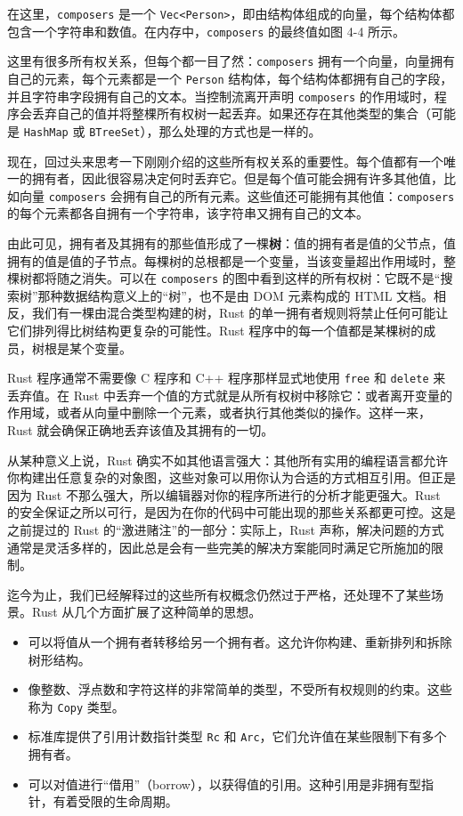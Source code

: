 在这里，\texttt{composers} 是一个 \texttt{Vec<Person>}，即由结构体组成的向量，每个结构体都包含一个字符串和数值。在内存中，\texttt{composers} 的最终值如图 4-4 所示。


这里有很多所有权关系，但每个都一目了然：\texttt{composers} 拥有一个向量，向量拥有自己的元素，每个元素都是一个 \texttt{Person} 结构体，每个结构体都拥有自己的字段，并且字符串字段拥有自己的文本。当控制流离开声明 \texttt{composers} 的作用域时，程序会丢弃自己的值并将整棵所有权树一起丢弃。如果还存在其他类型的集合（可能是 \texttt{HashMap} 或 \texttt{BTreeSet}），那么处理的方式也是一样的。

现在，回过头来思考一下刚刚介绍的这些所有权关系的重要性。每个值都有一个唯一的拥有者，因此很容易决定何时丢弃它。但是每个值可能会拥有许多其他值，比如向量 \texttt{composers} 会拥有自己的所有元素。这些值还可能拥有其他值：\texttt{composers} 的每个元素都各自拥有一个字符串，该字符串又拥有自己的文本。

由此可见，拥有者及其拥有的那些值形成了一棵\textbf{树}：值的拥有者是值的父节点，值拥有的值是值的子节点。每棵树的总根都是一个变量，当该变量超出作用域时，整棵树都将随之消失。可以在 \texttt{composers} 的图中看到这样的所有权树：它既不是“搜索树”那种数据结构意义上的“树”，也不是由 DOM 元素构成的 HTML 文档。相反，我们有一棵由混合类型构建的树，Rust 的单一拥有者规则将禁止任何可能让它们排列得比树结构更复杂的可能性。Rust 程序中的每一个值都是某棵树的成员，树根是某个变量。

Rust 程序通常不需要像 C 程序和 C++ 程序那样显式地使用 \texttt{free} 和 \texttt{delete} 来丢弃值。在 Rust 中丢弃一个值的方式就是从所有权树中移除它：或者离开变量的作用域，或者从向量中删除一个元素，或者执行其他类似的操作。这样一来，Rust 就会确保正确地丢弃该值及其拥有的一切。

从某种意义上说，Rust 确实不如其他语言强大：其他所有实用的编程语言都允许你构建出任意复杂的对象图，这些对象可以用你认为合适的方式相互引用。但正是因为 Rust 不那么强大，所以编辑器对你的程序所进行的分析才能更强大。Rust 的安全保证之所以可行，是因为在你的代码中可能出现的那些关系都更可控。这是之前提过的 Rust 的“激进赌注”的一部分：实际上，Rust 声称，解决问题的方式通常是灵活多样的，因此总是会有一些完美的解决方案能同时满足它所施加的限制。

迄今为止，我们已经解释过的这些所有权概念仍然过于严格，还处理不了某些场景。Rust 从几个方面扩展了这种简单的思想。

\begin{itemize}
\item 可以将值从一个拥有者转移给另一个拥有者。这允许你构建、重新排列和拆除树形结构。
\item 像整数、浮点数和字符这样的非常简单的类型，不受所有权规则的约束。这些称为 \texttt{Copy} 类型。
\item 标准库提供了引用计数指针类型 \texttt{Rc} 和 \texttt{Arc}，它们允许值在某些限制下有多个拥有者。
\item 可以对值进行“借用”（borrow），以获得值的引用。这种引用是非拥有型指针，有着受限的生命周期。
\end{itemize}

